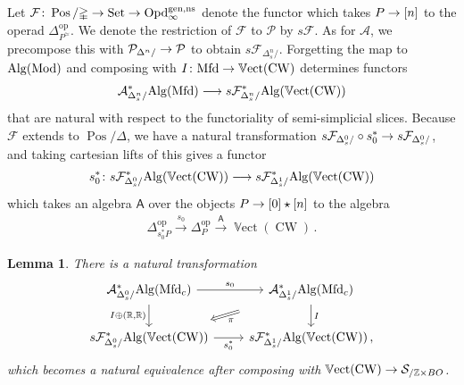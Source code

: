 \documentclass[10pt]{amsart}
\numberwithin{equation}{section}
\newtheorem{lem}[prop]{Lemma}
\theoremstyle{definition}
\DeclareMathOperator{\Mod}{Mod}
\DeclareMathOperator{\Set}{Set}
\DeclareMathOperator{\op}{op}
\DeclareMathOperator{\Pos}{Pos}
\DeclareMathOperator{\bVect}{\mathbb{V}ect}
\DeclareMathOperator{\CW}{CW}
\newcommand{\Mfd}{\mathrm{Mfd}\vphantom{d}}
\newcommand{\Alg}{\mathrm{Alg}\vphantom{z}}
\newcommand{\bZ}{\mathbb{Z}}
\newcommand{\bR}{\mathbb{R}}
\newcommand{\Simp}{\mathbb{\Delta}}
\newcommand{\cA}{\mathcal{A}}
\newcommand{\cP}{\mathcal{P}}
\newcommand{\cS}{\mathcal{S}}
\newcommand{\cF}{\mathcal{F}}
\newcommand{\sfA}{\mathsf{A}}
\newcommand{\Opd}{\mathrm{Opd}^{\mathrm{gen,ns}}_{\infty}}
\newcommand{\join}{\star}
\renewcommand{\to}{\mathchoice{\longrightarrow}{\rightarrow}{}{}}
\begin{document}
Let $\cF \colon \Pos/\Simp \to \Set \to \Opd$ denote the functor which takes $P\to [n]$ to the operad $\Simp^{\op}_{P^{\simeq}}$.
We denote the restriction of $\cF$ to $\cP$ by $s\cF$.
As for $\cA$, we precompose this with $\cP_{\Delta^{n}/} \to \cP$ to obtain $s\cF_{\Delta^{n}_{s}/}$.
Forgetting the map to $\Alg(\Mod)$ and composing with $I\colon \Mfd \to \bVect(\CW)$ determines functors
\begin{align*}
	\cA^{*}_{\Delta^{n}_{s}/}\Alg(\Mfd) \to s\cF^{*}_{\Delta^{n}_{s}/}\Alg(\bVect(\CW))
\end{align*}
that are natural with respect to the functoriality of semi-simplicial slices.
Because $\cF$ extends to $\Pos/\Simp$, we have a natural transformation $ s\cF_{\Delta^{0}_{s}/}\circ s_{0}^{*}  \to s\cF_{\Delta^{0}_{s}/}$, and taking cartesian lifts of this gives a functor
\begin{align*}
	s_{0}^{*} \colon s\cF^{*}_{\Delta^{0}_{s}/}\Alg(\bVect(\CW)) \to s\cF^{*}_{\Delta^{1}_{s}/}\Alg(\bVect(\CW))
\end{align*}
which takes an algebra $\sfA$ over the objects $P\to [0]\join [n]$ to the algebra
\begin{align*}
	\Simp^{\op}_{s_{0}^{*}P} \xrightarrow{s_{0}} \Simp^{\op}_{P} \xrightarrow{\sfA} \bVect(\CW) \,.
\end{align*}
\begin{lem}\label{lem:D_is_htpy_eq}
	There is a natural transformation
	\begin{equation*}
		\begin{tikzcd}
			\cA_{\Delta^{0}_{s}/}^{*}\Alg(\Mfd_{c}) \arrow[r,"s_{0}"] \arrow[d, "{I\oplus (\bR,\bR)}"']      &   \cA_{\Delta_{s}^{1}/}^{*}\Alg(\Mfd_{c}) \arrow[dl, "\pi", Rightarrow, shorten=2em]  \arrow[d, "I"] \\
			s\cF_{\Delta^{0}_{s}/}^{*}\Alg(\bVect(\CW))  \arrow[r, "s_{0}^{*}"']               &  s\cF_{\Delta^{1}_{s}/}^{*}\Alg(\bVect(\CW)) \, ,
		\end{tikzcd}
	\end{equation*}
	which becomes a natural equivalence after composing with $\bVect(\CW) \to \cS_{/\bZ\times BO}$.
\end{lem}
\end{document}

